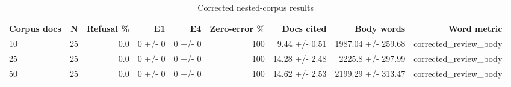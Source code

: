 \begin{table}[ht]
\centering
\caption{Corrected nested-corpus results}
\scriptsize
\begin{tabular}{lrrrrrrrr}
\toprule
Corpus docs & N & Refusal \% & E1 & E4 & Zero-error \% & Docs cited & Body words & Word metric \\
\midrule
10 & 25 & 0.0 & 0 +/- 0 & 0 +/- 0 & 100 & 9.44 +/- 0.51 & 1987.04 +/- 259.68 & corrected\_review\_body \\
25 & 25 & 0.0 & 0 +/- 0 & 0 +/- 0 & 100 & 14.28 +/- 2.48 & 2225.8 +/- 297.99 & corrected\_review\_body \\
50 & 25 & 0.0 & 0 +/- 0 & 0 +/- 0 & 100 & 14.62 +/- 2.53 & 2199.29 +/- 313.47 & corrected\_review\_body \\
\bottomrule
\end{tabular}
\end{table}
